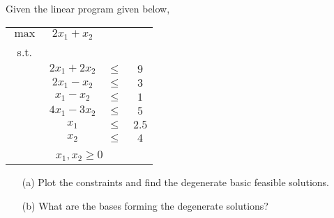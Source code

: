 
Given the linear program given below,

\begin{center}
	\begin{enumerate}
		\begin{tabular}{*4c}
			$\max$ & $2x_1 + x_2$ & \\
			s.t. \\
			& $2x_1 + 2x_2$ & $\leq$ & $9$  \\
			& $2x_1 -  x_2$ & $\leq$ & $3$   \\
			& $ x_1 -  x_2$ & $\leq$ & $1$   \\
			& $4x_1 - 3x_2$ & $\leq$ & $5$   \\
			& $x_1$         & $\leq$ & $2.5$ \\
			& $x_2$         & $\leq$ & $4$   \\
			\\
			\multicolumn{4}{c}{$x_1, x_2 \geq 0$}\\
		\end{tabular}
	\end{enumerate}
\end{center}

\begin{itemize}
	\item[(a)] Plot the constraints and find the degenerate basic feasible solutions.
	\item[(b)] What are the bases forming the degenerate solutions?
\end{itemize}